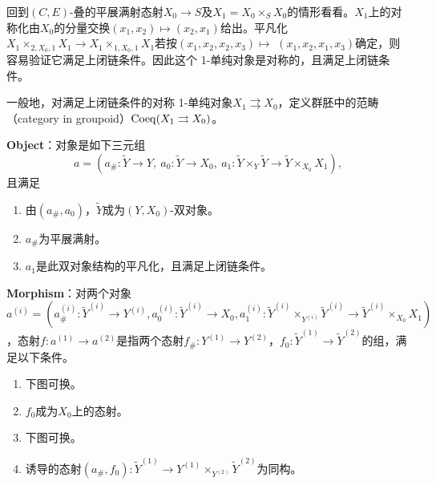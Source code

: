 
回到$(C,E)$-叠的平展满射态射$X_0\to S$及$X_1=X_0\times_SX_0$的情形看看。$X_1$上的对称化由$X_0$的分量交换$(x_1,x_2)\mapsto(x_2,x_1)$给出。平凡化$X_1\times_{2,X_0,1}X_1\to X_1\times_{1,X_0,1}X_1$若按$(x_1,x_2,x_2,x_3)\mapsto$
$(x_1,x_2,x_1,x_3)$确定，则容易验证它满足上闭链条件。因此这个 1-单纯对象是对称的，且满足上闭链条件。

一般地，对满足上闭链条件的对称 1-单纯对象$X_1\rightrightarrows X_0$，定义群胚中的范畴（category in groupoid）$\operatorname{Coeq}(X_1\rightrightarrows X_0)$。

\textbf{Object}：对象是如下三元组
\[
a=(a_\#:\tilde Y\to Y,\ a_0:\tilde Y\to X_0,\ a_1:\tilde Y\times_Y\tilde Y\to\tilde Y\times_{X_0}X_1),
\]
且满足
\begin{enumerate}[label=(\arabic*)]
\item 由$(a_\#,a_0)$，$\tilde Y$成为$(Y,X_0)$-双对象。
\item $a_\#$为平展满射。
\item $a_1$是此双对象结构的平凡化，且满足上闭链条件。
\end{enumerate}

\textbf{Morphism}：对两个对象$a^{(i)}=(a_\#^{(i)}:\tilde Y^{(i)}\to Y^{(i)},a_0^{(i)}:\tilde Y^{(i)}\to X_0,a_1^{(i)}:\tilde Y^{(i)}\times_{Y^{(i)}}\tilde Y^{(i)}\to\tilde Y^{(i)}\times_{X_0}X_1)$，态射$f:a^{(1)}\to a^{(2)}$是指两个态射$f_\#:Y^{(1)}\to Y^{(2)}$，$f_0:\tilde Y^{(1)}\to\tilde Y^{(2)}$的组，满足以下条件。
\begin{enumerate}[label=(\arabic*)]
\item 下图可换。
\begin{center}
\end{center}
\item $f_0$成为$X_0$上的态射。
\item 下图可换。
\begin{center}
\end{center}
\item 诱导的态射$(a_\#,f_0):\tilde Y^{(1)}\to Y^{(1)}\times_{Y^{(2)}}\tilde Y^{(2)}$为同构。
\end{enumerate}

